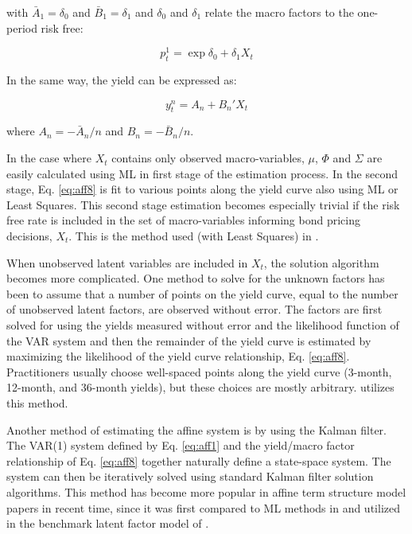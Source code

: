 \documentclass{article}
\numberwithin{equation}{section}
\begin{document}
with $\bar{A}_1=\delta_0$ and $\bar{B}_1=\delta_1$ and $\delta_0$ and
$\delta_1$ relate the macro factors to the one-period risk free:

\begin{equation}
    p_t^1=\exp{\delta_0+\delta_1X_t}
    \label{eq:aff7}
\end{equation}

In the same way, the yield can be expressed as:

\begin{equation}
    y_t^n=A_n+B_n'X_t
    \label{eq:aff8}
\end{equation}

where $A_n=-\bar{A}_n/n$ and $B_n=-\bar{B}_n/n$.

In the case where $X_t$ contains only observed macro-variables, $\mu$, $\Phi$
and $\Sigma$ are easily calculated using ML in first stage of the estimation
process. In the second stage, Eq. \ref{eq:aff8} is fit to various points along
the yield curve also using ML or Least Squares. This second stage estimation
becomes especially trivial if the risk free rate is included in the set of
macro-variables informing bond pricing decisions, $X_t$. This is the method
used (with Least Squares) in \citet{sack2005monetary}.

When unobserved latent variables are included in $X_t$, the solution algorithm
becomes more complicated. One method to solve for the unknown factors has been
to assume that a number of points on the yield curve, equal to the number of
unobserved latent factors, are observed without error. The factors are first
solved for using the yields measured without error and the likelihood function
of the VAR system and then the remainder of the yield curve is estimated by
maximizing the likelihood of the yield curve relationship, Eq. \ref{eq:aff8}.
Practitioners usually choose well-spaced points along the yield curve (3-month,
12-month, and 36-month yields), but these choices are mostly arbitrary.
\citet{ang2003no} utilizes this method.

Another method of estimating the affine system is by using the Kalman filter.
The VAR(1) system defined by Eq. \ref{eq:aff1} and the yield/macro factor
relationship of Eq. \ref{eq:aff8} together naturally define a state-space
system. The system can then be iteratively solved using standard Kalman filter
solution algorithms. This method has become more popular in affine term
structure model papers in recent time, since it was first compared to ML
methods in \citet{duffee2004estimation} and utilized in the benchmark latent
factor model of \citet{kim2005arbitrage}.
\end{document}
